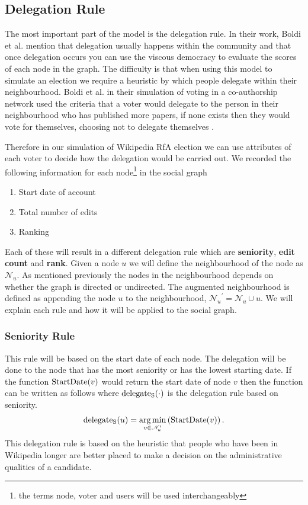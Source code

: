 \subsection{Delegation Rule}
The most important part of the model is the delegation rule. In their work, Boldi et al. mention that delegation usually happens within the community and that once delegation occurs you can use the viscous democracy to evaluate the scores of each node in the graph. The difficulty is that when using this model to simulate an election we require a heuristic by which people delegate within their neighbourhood. Boldi et al. in their simulation of voting in a co-authorship network used the criteria that a voter would delegate to the person in their neighbourhood who has published more papers, if none exists then they would vote for themselves, choosing not to delegate themselves \cite{ViscousDemocracy}.

Therefore in our simulation of Wikipedia RfA election we can use attributes of each voter to decide how the delegation would be carried out. We recorded the following information for each node\footnote{the terms node, voter and users will be used interchangeably} in the social graph
\begin{enumerate}
    \item Start date of account
    \item Total number of edits
    \item Ranking
\end{enumerate}
Each of these will result in a different delegation rule which are \textbf{seniority}, \textbf{edit count} and \textbf{rank}. Given a node $u$ we will define the neighbourhood of the node as $\mathcal{N}_u$. As mentioned previously the nodes in the neighbourhood depends on whether the graph is directed or undirected. The augmented neighbourhood is defined as appending the node $u$ to the neighbourhood, ${\mathcal{N}_u}^\prime = \mathcal{N}_u \cup u$. We will explain each rule and how it will be applied to the social graph.

\subsubsection{Seniority Rule}
This rule will be based on the start date of each node. The delegation will be done to the node that has the most seniority or has the lowest starting date. If the function $\operatorname*{StartDate}(v)$ would return the start date of node $v$ then the function can be written as follows where $\operatorname*{delegate_S}(\cdot)$ is the delegation rule based on seniority.
\[\operatorname*{delegate_S}(u)  = \operatorname*{arg\,min}_{v \in \mathcal{N}_u^\prime} \left( \operatorname*{StartDate}(v) \right).\]
This delegation rule is based on the heuristic that people who have been in Wikipedia longer are better placed to make a decision on the administrative qualities of a candidate. 


